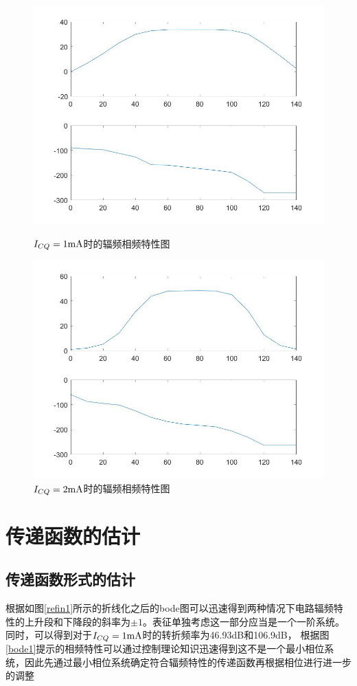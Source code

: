 \documentclass[UTF8,a4paper]{ctexart}
\begin{document}
\begin{figure}
\centering
\includegraphics[width=\textwidth]{bode1exp.jpg}
\caption{$I_{CQ}=1\rm{mA}$时的辐频相频特性图}
\label{bode1}
\includegraphics[width=\textwidth]{bode2exp.jpg}
\caption{$I_{CQ}=2\rm{mA}$时的辐频相频特性图}
\label{bode2}
\end{figure}
\section{传递函数的估计}
\subsection{传递函数形式的估计}
根据如图\ref{refin1}所示的折线化之后的bode图可以迅速得到两种情况下电路辐频特性的上升段和下降段的斜率为$\pm1$。表征单独考虑这一部分应当是一个一阶系统。同时，可以得到对于$I_{CQ}=1\rm{mA}$时的转折频率为46.93dB和106.9dB，
根据图\ref{bode1}提示的相频特性可以通过控制理论知识迅速得到这不是一个最小相位系统，因此先通过最小相位系统确定符合辐频特性的传递函数再根据相位进行进一步的调整
\end{document}
